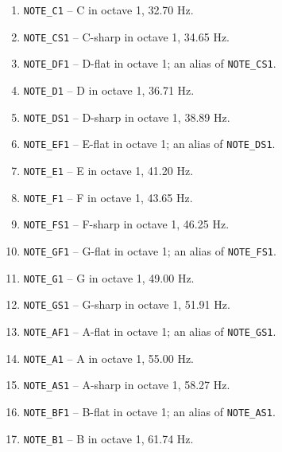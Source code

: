 \begin{enumerate}
    \item \texttt{NOTE\_C1} -- C in octave 1, 32.70 Hz.
    \item \texttt{NOTE\_CS1} -- C-sharp in octave 1, 34.65 Hz.
    \item \texttt{NOTE\_DF1} -- D-flat in octave 1; an alias of \texttt{NOTE\_CS1}.
    \item \texttt{NOTE\_D1} -- D in octave 1, 36.71 Hz.
    \item \texttt{NOTE\_DS1} -- D-sharp in octave 1, 38.89 Hz.
    \item \texttt{NOTE\_EF1} -- E-flat in octave 1; an alias of \texttt{NOTE\_DS1}.
    \item \texttt{NOTE\_E1} -- E in octave 1, 41.20 Hz.
    \item \texttt{NOTE\_F1} -- F in octave 1, 43.65 Hz.
    \item \texttt{NOTE\_FS1} -- F-sharp in octave 1, 46.25 Hz.
    \item \texttt{NOTE\_GF1} -- G-flat in octave 1; an alias of \texttt{NOTE\_FS1}.
    \item \texttt{NOTE\_G1} -- G in octave 1, 49.00 Hz.
    \item \texttt{NOTE\_GS1} -- G-sharp in octave 1, 51.91 Hz.
    \item \texttt{NOTE\_AF1} -- A-flat in octave 1; an alias of \texttt{NOTE\_GS1}.
    \item \texttt{NOTE\_A1} -- A in octave 1, 55.00 Hz.
    \item \texttt{NOTE\_AS1} -- A-sharp in octave 1, 58.27 Hz.
    \item \texttt{NOTE\_BF1} -- B-flat in octave 1; an alias of \texttt{NOTE\_AS1}.
    \item \texttt{NOTE\_B1} -- B in octave 1, 61.74 Hz.


\end{enumerate}
